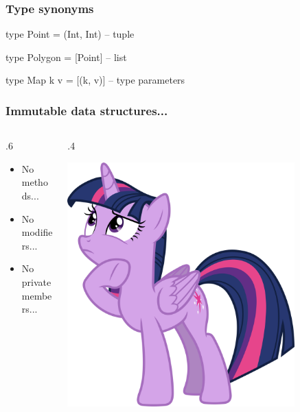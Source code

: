 \documentclass[17pt]{beamer}
\renewcommand{\(}[1]{\begin{columns}[#1]}
\renewcommand{\)}{\end{columns}}
\newcommand{\<}[1]{\begin{column}{#1}}
\renewcommand{\>}{\end{column}}
\begin{document}
\begin{frame}[fragile]
\frametitle{Type synonyms}
\begin{code}
    type Point   = (Int, Int)  -- tuple
\end{code}
\pause
\begin{code}
    type Polygon = [Point]     -- list
\end{code}
\pause
\begin{code}
    type Map k v = [(k, v)]    -- type parameters
\end{code}
\end{frame}

\begin{frame}
\frametitle{Immutable data structures...}
\({c}
\<{.6\textwidth}
\begin{center}
  \begin{itemize}
  \item<2-> No methods...
  \item<3-> No modifiers...
  \item<4-> No private members...
  \end{itemize}
\end{center}
\>
\<{.4\textwidth}
\begin{center}
  \includegraphics[width=0.8\textwidth]{img/twilightthinking}
\end{center}
\>
\)
\end{frame}
\end{document}
